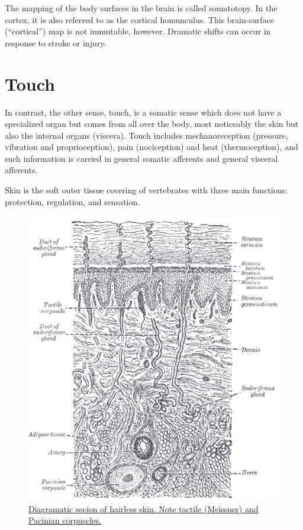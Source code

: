 The mapping of the body surfaces in the brain is called somatotopy. In the cortex, it is also referred to as the cortical homunculus. This brain-surface (``cortical'') map is not immutable, however. Dramatic shifts can occur in response to stroke or injury.

\hypertarget{touch}{%
\section{Touch}\label{touch}}

In contrast, the other sense, touch, is a somatic sense which does not have a specialized organ but comes from all over the body, most noticeably the skin but also the internal organs (viscera). Touch includes mechanoreception (pressure, vibration and proprioception), pain (nociception) and heat (thermoception), and such information is carried in general somatic afferents and general visceral afferents.

Skin is the soft outer tissue covering of vertebrates with three main functions: protection, regulation, and sensation.



\begin{figure}

{\centering \includegraphics[width=0.7\linewidth]{./figures/somatosensory/Gray940} 

}

\caption{\href{https://commons.wikimedia.org/wiki/File:Gray940.png}{Diagramatic secion of hairless skin. Note tactile (Meissner) and Pacinian corpuscles.}}\label{fig:skindiagram}
\end{figure}

